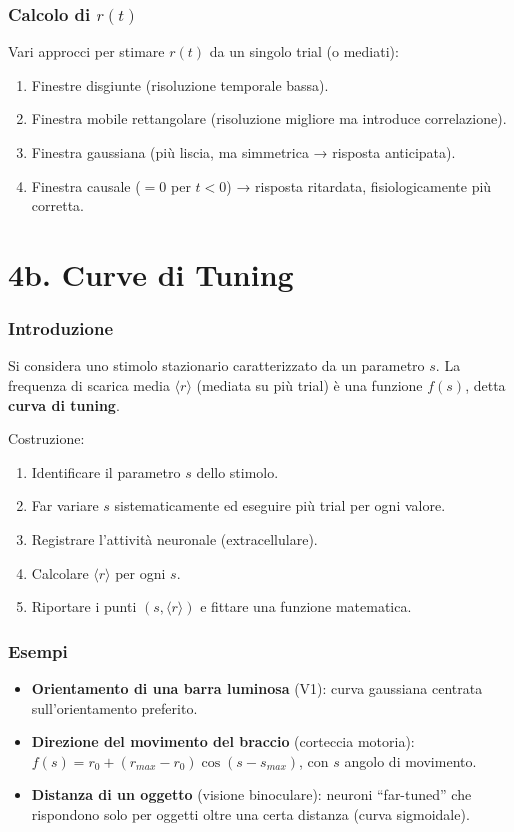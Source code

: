 \documentclass[12pt,a4paper,openany]{book}
\begin{document}
\subsubsection{Calcolo di $r(t)$}

Vari approcci per stimare $r(t)$ da un singolo trial (o mediati):
\begin{enumerate}
  \item Finestre disgiunte (risoluzione temporale bassa).
  \item Finestra mobile rettangolare (risoluzione migliore ma introduce correlazione).
  \item Finestra gaussiana (più liscia, ma simmetrica → risposta anticipata).
  \item Finestra causale ($=0$ per $t<0$) → risposta ritardata, fisiologicamente più corretta.
\end{enumerate}

\section{4b. Curve di Tuning}

\subsubsection{Introduzione}

Si considera uno stimolo stazionario caratterizzato da un parametro $s$. La frequenza di scarica media $\langle r \rangle$ (mediata su più trial) è una funzione $f(s)$, detta \textbf{curva di tuning}.

Costruzione:
\begin{enumerate}
  \item Identificare il parametro $s$ dello stimolo.
  \item Far variare $s$ sistematicamente ed eseguire più trial per ogni valore.
  \item Registrare l'attività neuronale (extracellulare).
  \item Calcolare $\langle r \rangle$ per ogni $s$.
  \item Riportare i punti $(s,\langle r \rangle)$ e fittare una funzione matematica.
\end{enumerate}

\subsubsection{Esempi}
\begin{itemize}
  \item \textbf{Orientamento di una barra luminosa} (V1): curva gaussiana centrata sull'orientamento preferito.
  \item \textbf{Direzione del movimento del braccio} (corteccia motoria): $f(s) = r_0 + (r_{max}-r_0)\cos(s - s_{max})$, con $s$ angolo di movimento.
  \item \textbf{Distanza di un oggetto} (visione binoculare): neuroni “far-tuned” che rispondono solo per oggetti oltre una certa distanza (curva sigmoidale).
\end{itemize}
\end{document}
